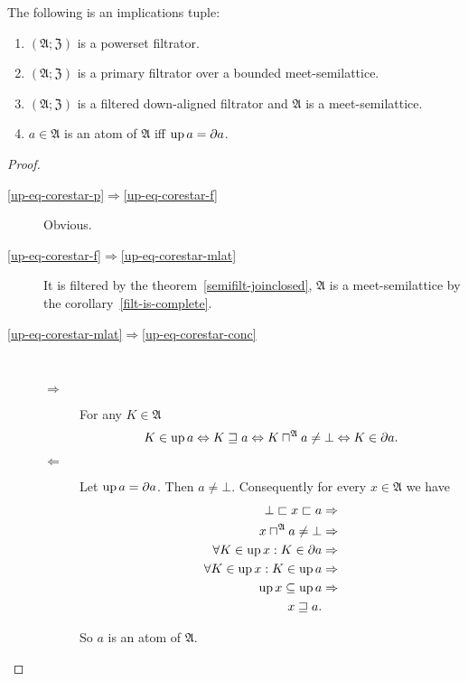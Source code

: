 \begin{thm}
\label{up-eq-corestar}The following is an implications tuple:
\begin{enumerate}
\item \label{up-eq-corestar-p}$(\mathfrak{A};\mathfrak{Z})$ is a powerset
filtrator.
\item \label{up-eq-corestar-f}$(\mathfrak{A};\mathfrak{Z})$ is a primary
filtrator over a bounded meet-semilattice.
\item \label{up-eq-corestar-mlat}$(\mathfrak{A};\mathfrak{Z})$ is a filtered
down-aligned filtrator and $\mathfrak{A}$ is a meet-semilattice.
\item \label{up-eq-corestar-conc}$a\in\mathfrak{A}$ is an atom of $\mathfrak{A}$
iff $\operatorname{up} a=\partial a$.
\end{enumerate}
\end{thm}
\begin{proof}
~
\begin{description}
\item [{\ref{up-eq-corestar-p}$\Rightarrow$\ref{up-eq-corestar-f}}] Obvious.
\item [{\ref{up-eq-corestar-f}$\Rightarrow$\ref{up-eq-corestar-mlat}}] It
is filtered by the theorem~\ref{semifilt-joinclosed}, $\mathfrak{A}$
is a meet-semilattice by the corollary~\ref{filt-is-complete}.
\item [{\ref{up-eq-corestar-mlat}$\Rightarrow$\ref{up-eq-corestar-conc}}] ~

\begin{description}
\item [{$\Rightarrow$}] For any $K\in\mathfrak{A}$
\[
K\in\operatorname{up} a\Leftrightarrow K\sqsupseteq a\Leftrightarrow K\sqcap^{\mathfrak{A}}a\ne\bot\Leftrightarrow K\in\partial a.
\]

\item [{$\Leftarrow$}] Let $\operatorname{up} a=\partial a$. Then $a\ne\bot$. Consequently
for every $x\in\mathfrak{A}$ we have
\begin{align*}
\bot\sqsubset x\sqsubset a & \Rightarrow\\
x\sqcap^{\mathfrak{A}}a\ne\bot & \Rightarrow\\
\forall K\in\operatorname{up} x:K\in\partial a & \Rightarrow\\
\forall K\in\operatorname{up} x:K\in\operatorname{up} a & \Rightarrow\\
\operatorname{up} x\subseteq\operatorname{up} a & \Rightarrow\\
x\sqsupseteq a.
\end{align*}



So $a$ is an atom of $\mathfrak{A}$.

\end{description}
\end{description}
\end{proof}
